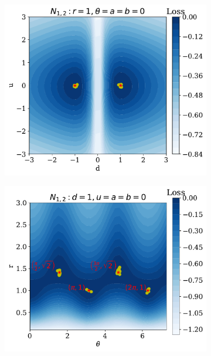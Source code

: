 \begin{figure}
    \centering
    \begin{subfigure}[b]{0.31\textwidth}
        \centering
        \includegraphics[width=\textwidth]{figures/chapter-09/6GL2asymmDU.pdf}
        \caption{}
        \label{fig:AGL2asymm_i}
    \end{subfigure}
    \hfill
    \begin{subfigure}[b]{0.31\textwidth}
        \centering
        \includegraphics[width=\textwidth]{figures/chapter-09/6GL2asymmTR.pdf}
        \caption{}

\end{subfigure}
\end{figure}
